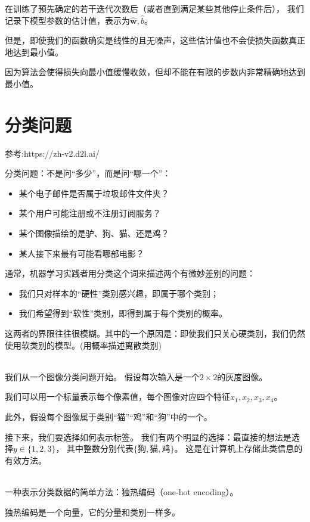 \documentclass[openany,11pt]{book}
\begin{document}
在训练了预先确定的若干迭代次数后（或者直到满足某些其他停止条件后），
我们记录下模型参数的估计值，表示为$\hat{\mathbf{w}}, \hat{b}$。

但是，即使我们的函数确实是线性的且无噪声，这些估计值也不会使损失函数真正地达到最小值。

因为算法会使得损失向最小值缓慢收敛，但却不能在有限的步数内非常精确地达到最小值。





\chapter{分类问题}
参考:https://zh-v2.d2l.ai/

分类问题：不是问“多少”，而是问“哪一个”：
\begin{itemize}
	\item  某个电子邮件是否属于垃圾邮件文件夹？
	\item  某个用户可能注册或不注册订阅服务？
	\item  某个图像描绘的是驴、狗、猫、还是鸡？
	\item  某人接下来最有可能看哪部电影？
\end{itemize}
通常，机器学习实践者用分类这个词来描述两个有微妙差别的问题：
\begin{itemize}
	\item 我们只对样本的“硬性”类别感兴趣，即属于哪个类别；
	\item 我们希望得到“软性”类别，即得到属于每个类别的概率。
\end{itemize}
这两者的界限往往很模糊。其中的一个原因是：即使我们只关心硬类别，我们仍然使用软类别的模型。(用概率描述离散类别)

~\\
我们从一个图像分类问题开始。{\color{red} 假设每次输入是一个$2\times2$的灰度图像。}

我们可以用一个标量表示每个像素值，每个图像对应四个特征$x_1, x_2, x_3, x_4$。

此外，假设每个图像属于类别“猫”“鸡”和“狗”中的一个。

接下来，我们要选择如何表示标签。
我们有两个明显的选择：最直接的想法是选择$y \in \{1, 2, 3\}$，
其中整数分别代表$\{\text{狗}, \text{猫}, \text{鸡}\}$。
这是在计算机上存储此类信息的有效方法。

~\\
{\color{red} 一种表示分类数据的简单方法：独热编码（one-hot encoding）。}

独热编码是一个向量，它的分量和类别一样多。
\end{document}

